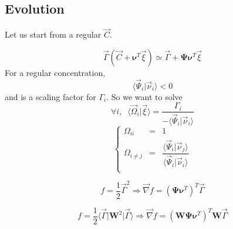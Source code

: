 \documentclass[aps,12pt]{revtex4}
\begin{document}
\subsection{Evolution}
Let us start from a regular $\vec{C}$.

\begin{equation}
	\vec{\Gamma}(\vec{C}+\bm{\nu}^T \vec{\xi}) \simeq \vec{\Gamma} + \bm{\Psi} \bm{\nu}^T \vec{\xi}
\end{equation}
For a regular concentration,
\begin{equation}
	\langle\vec{\Psi}_i \vert \vec{\nu}_i\rangle < 0
\end{equation}
and is a scaling factor for $\Gamma_i$. So we want to solve
\begin{equation}
	\forall i, \;\; \langle \vec{\Omega}_i \vert \vec{\xi} \rangle = \dfrac{\Gamma_i}{-\langle\vec{\Psi}_i \vert \vec{\nu}_i\rangle}
\end{equation}
\begin{equation}
\left\lbrace
	\begin{array}{rcl}
	\Omega_{ii}   & = & 1\\
	\Omega_{i\not=j} & = & \dfrac{\langle\vec{\Psi}_i \vert \vec{\nu}_j\rangle}{\langle\vec{\Psi}_i \vert \vec{\nu}_i\rangle}\\
	\end{array}
\right.
\end{equation}

\begin{equation}
	f = \dfrac{1}{2} \vec{\Gamma}^2 \Rightarrow \vec{\nabla} f = \left(\bm{\Psi} \bm{\nu}^T\right)^T \vec{\Gamma}
\end{equation}

\begin{equation}
	f = \dfrac{1}{2} \langle \vec{\Gamma} \vert \bm{W}^2 \vert \vec{\Gamma} \rangle \Rightarrow \vec{\nabla} f = \left(\bm{W}\bm{\Psi} \bm{\nu}^T\right)^T \bm{W}\vec{\Gamma}
\end{equation}

 
\end{document}
